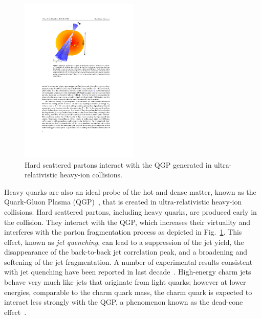 \documentclass[12pt, a4paper, twoside, titlepage]{article}
\begin{document}
\begin{figure}[tbh]
\begin{center}
\includegraphics[width=0.5\textwidth]{img/jetquenching}
 \caption{Hard scattered partons interact with the QGP generated in ultra-relativistic heavy-ion collisions.} 
 \label{fig:jetquenching}
\end{center}
\end{figure}
Heavy quarks are also an ideal probe of the hot and dense matter, known as the Quark-Gluon Plasma (QGP)~\cite{STAR:2005a, PHENIX:2005a, ALICE:2010b, ALICE:2011b, CMS:2013d, ATLAS:2013c}, 
that is created in ultra-relativistic heavy-ion collisions. 
Hard scattered partons, including heavy quarks, are produced early in the collision. They interact with the QGP, which increases their virtuality and interferes with the
parton fragmentation process as depicted in Fig.~\ref{fig:jetquenching}. 
This effect, known as \emph{jet quenching}, can lead to a suppression of the jet yield, the disappearance of the back-to-back jet correlation peak,
and a broadening and softening of the jet fragmentation. 
A number of experimental results consistent with jet quenching have been reported in last decade~\cite{PHENIX:2003a, PHENIX:2008b, STAR:2003b, STAR:2003c, STAR:2006a, ALICE:2010d, CMS:2011c, CMS:2012b, ATLAS:2014d, ALICE:2015a}.
High-energy charm jets behave very much like jets that originate from light quarks; however at lower energies, comparable to the charm quark mass, the charm quark is expected
to interact less strongly with the QGP, a phenomenon known as the dead-cone effect~\cite{Dokshitzer:2001}.
\end{document}
